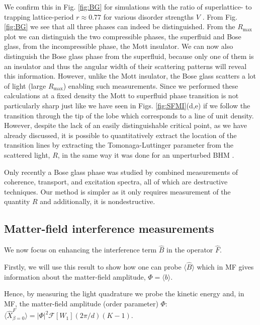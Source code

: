 We confirm this in Fig. \ref{fig:BG} for simulations with the ratio of
superlattice- to trapping lattice-period $r\approx 0.77$ for various
disorder strengths $V$ \cite{roux2008}. From Fig. \ref{fig:BG} we see
that all three phases can indeed be distinguished. From the
$R_\mathrm{max}$ plot we can distinguish the two compressible phases,
the superfluid and Bose glass, from the incompressible phase, the Mott
insulator. We can now also distinguish the Bose glass phase from the
superfluid, because only one of them is an insulator and thus the
angular width of their scattering patterns will reveal this
information. However, unlike the Mott insulator, the Bose glass
scatters a lot of light (large $R_\mathrm{max}$) enabling such
measurements. Since we performed these calculations at a fixed density
the Mott to superfluid phase transition is not particularly sharp
\cite{cazalilla2011, ejima2011, kuhner2000, pino2012, pino2013} just
like we have seen in Figs. \ref{fig:SFMI}(d,e) if we follow the
transition through the tip of the lobe which corresponds to a line of
unit density. However, despite the lack of an easily distinguishable
critical point, as we have already discussed, it is possible to
quantitatively extract the location of the transition lines by
extracting the Tomonaga-Luttinger parameter from the scattered light,
$R$, in the same way it was done for an unperturbed BHM
\cite{ejima2011}.

Only recently \cite{derrico2014} a Bose glass phase was studied by
combined measurements of coherence, transport, and excitation spectra,
all of which are destructive techniques. Our method is simpler as it
only requires measurement of the quantity $R$ and additionally, it is
nondestructive.

\subsection{Matter-field interference measurements}

We now focus on enhancing the interference term $\hat{B}$ in the
operator $\hat{F}$. 

Firstly, we will use this result to show how one can probe
$\langle \hat{B} \rangle$ which in MF gives information about the
matter-field amplitude, $\Phi = \langle b \rangle$. 

Hence, by measuring the light quadrature we probe the kinetic energy
and, in MF, the matter-field amplitude (order parameter) $\Phi$:
$\langle \hat{X}^F_{\beta=0} \rangle = | \Phi |^2
\mathcal{F}[W_1](2\pi/d) (K-1)$.

